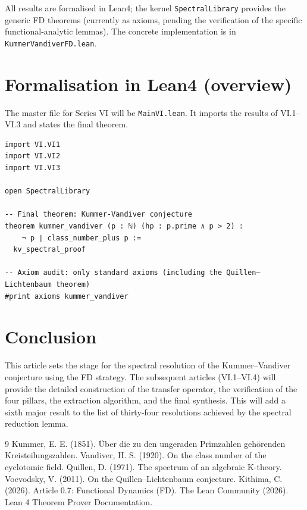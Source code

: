 \documentclass[11pt,a4paper]{article}
\begin{document}
All results are formalised in Lean4; the kernel \texttt{SpectralLibrary} provides the generic FD theorems (currently as axioms, pending the verification of the specific functional‑analytic lemmas). The concrete implementation is in \texttt{KummerVandiverFD.lean}.

\section{Formalisation in Lean4 (overview)}

The master file for Series VI will be \texttt{MainVI.lean}. It imports the results of VI.1–VI.3 and states the final theorem.

\begin{lstlisting}[style=lean, caption={MainVI.lean (sketch)}]
import VI.VI1
import VI.VI2
import VI.VI3

open SpectralLibrary

-- Final theorem: Kummer‑Vandiver conjecture
theorem kummer_vandiver (p : ℕ) (hp : p.prime ∧ p > 2) :
    ¬ p ∣ class_number_plus p :=
  kv_spectral_proof

-- Axiom audit: only standard axioms (including the Quillen–Lichtenbaum theorem)
#print axioms kummer_vandiver
\end{lstlisting}

\section{Conclusion}

This article sets the stage for the spectral resolution of the Kummer–Vandiver conjecture using the FD strategy. The subsequent articles (VI.1–VI.4) will provide the detailed construction of the transfer operator, the verification of the four pillars, the extraction algorithm, and the final synthesis. This will add a sixth major result to the list of thirty‑four resolutions achieved by the spectral reduction lemma.


\begin{thebibliography}{9}
  Kummer, E. E. (1851). Über die zu den ungeraden Primzahlen gehörenden Kreisteilungszahlen.
  Vandiver, H. S. (1920). On the class number of the cyclotomic field.
  Quillen, D. (1971). The spectrum of an algebraic K‑theory.
  Voevodsky, V. (2011). On the Quillen–Lichtenbaum conjecture.
  Kithima, C. (2026). Article 0.7: Functional Dynamics (FD).
  The Lean Community (2026). Lean 4 Theorem Prover Documentation.
\end{thebibliography}
\end{document}
